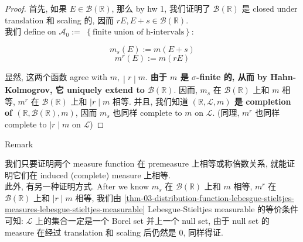 \begin{proof}

首先, 如果 \(E \in \mathcal{B}(\mathbb{R})\), 那么 by hw 1, 我们证明了 \(\mathcal{B}(\mathbb{R})\) 是 closed under translation 和 scaling 的, 因而 \(rE,E + s \in \mathcal{B}(\mathbb{R})\).\\
我们 define on \(\mathcal{A}_{0} :=\) \(\left\{ \text{finite union of h-intervals} \right\}\):

\[m_{s}(E) := m(E + s)\]\[m^{r}(E) := m(rE)\]

显然, 这两个函数 agree with \(\left. m, \middle| r \middle| m \right.\). \textbf{由于 \(m\) 是 \(\sigma\)-finite 的, 从而 by Hahn-Kolmogrov, 它 uniquely extend to \(\mathcal{B}(\mathbb{R})\)}. 因而, \(m_{s}\) 在 \(\mathcal{B}(\mathbb{R})\) 上和 \(m\) 相等, \(m^{r}\) 在 \(\mathcal{B}(\mathbb{R})\) 上和 \(\left. |r \middle| m \right.\) 相等. 并且, 我们知道 \textbf{\((\mathbb{R},\mathcal{L},m)\) 是 completion of \((\mathbb{R},\mathcal{B}(\mathbb{R}),m)\)}, 因而 \(m_{s}\) 也同样 complete to \(m\) on \(\mathcal{L}\). (同理, \(m^{r}\) 也同样 complete to \(\left. |r \middle| m \right.\) on \(\mathcal{L}\))

\end{proof}

\begin{qlremark}{Remark}

我们只要证明两个 measure function 在 premeasure 上相等或称倍数关系, 就能证明它们在 induced (complete) measure 上相等.\\
此外, 有另一种证明方式. After we know \(m_{s}\) 在 \(\mathcal{B}(\mathbb{R})\) 上和 \(m\) 相等, \(m^{r}\) 在 \(\mathcal{B}(\mathbb{R})\) 上和 \(\left. |r \middle| m \right.\) 相等, 我们由 \ref{thm-03-distribution-function-lebesgue-stieltjes-measures-lebesgue-stieltjes-measurable} Lebesgue-Stieltjes measurable 的等价条件 可知: \(\mathcal{L}\) 上的集合一定是一个 Borel set 并上一个 null set, 由于 null set 的 measure 在经过 translation 和 scaling 后仍然是 0, 同样得证.

\end{qlremark}
